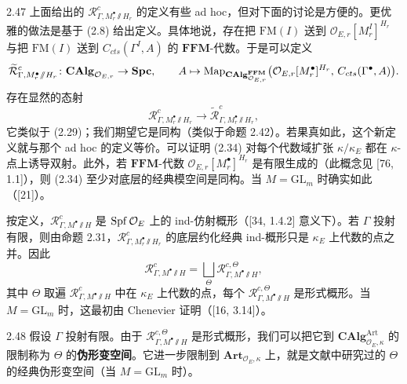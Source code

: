 \begin{rem}{2.47}
上面给出的 $\mathcal R^c_{\Gamma,M^\bullet_r\sslash H_r}$ 的定义有些 ad hoc，但对下面的讨论是方便的。更优雅的做法是基于 (2.8) 给出定义。具体地说，存在把 $\mathrm{FM}(I)$ 送到 $\mathcal O_{E,r}[M^I_r]^{H_r}$ 与把 $\mathrm{FM}(I)$ 送到 $C_{cts}(\Gamma^I, A)$ 的 $\mathbf{FFM}$-代数。于是可以定义
\[
\widetilde{\mathcal R}^{c}_{\Gamma,M^\bullet_r\sslash H_r}\colon \mathbf{CAlg}_{\mathcal O_{E,r}} \to \mathbf{Spc},\qquad
A \mapsto \operatorname{Map}_{\mathbf{CAlg}^{\mathbf{FFM}}_{\mathcal O_{E,r}}}\bigl(\mathcal O_{E,r}[M^\bullet_r]^{H_r},\, C_{cts}(\Gamma^\bullet, A)\bigr).
\]
存在显然的态射
\begin{equation}
\tag{2.34}
\mathcal R^{c}_{\Gamma,M^\bullet_r\sslash H_r} \to \widetilde{\mathcal R}^{c}_{\Gamma,M^\bullet_r\sslash H_r},
\end{equation}
它类似于 (2.29)；我们期望它是同构（类似于命题 2.42）。若果真如此，这个新定义就与那个 ad hoc 的定义等价。可以证明 (2.34) 对每个代数域扩张 $\kappa/\kappa_E$ 都在 $\kappa$-点上诱导双射。此外，若 $\mathbf{FFM}$-代数 $\mathcal O_{E,r}[M^\bullet_r]^{H_r}$ 是有限生成的（此概念见 [76, 1.1]），则 (2.34) 至少对底层的经典模空间是同构。当 $M = \mathrm{GL}_m$ 时确实如此（[21]）。
\label{rem:zhu2-2-47}
\end{rem}

按定义，$\mathcal R^c_{\Gamma,M^\bullet\sslash H}$ 是 $\operatorname{Spf}\mathcal O_E$ 上的 ind-仿射概形（[34, 1.4.2] 意义下）。若 $\Gamma$ 投射有限，则由命题 2.31，$\mathcal R^c_{\Gamma,M^\bullet_r\sslash H_r}$ 的底层约化经典 ind-概形只是 $\kappa_E$ 上代数的点之并。因此
\begin{equation}
\tag{2.35}
\mathcal R^c_{\Gamma,M^\bullet\sslash H} = \bigsqcup_\Theta \mathcal R^{c,\Theta}_{\Gamma,M^\bullet\sslash H},
\end{equation}
其中 $\Theta$ 取遍 $\mathcal R^c_{\Gamma,M^\bullet\sslash H}$ 中在 $\kappa_E$ 上代数的点，每个 $\mathcal R^{c,\Theta}_{\Gamma,M^\bullet\sslash H}$ 是形式概形。当 $M = \mathrm{GL}_m$ 时，这最初由 Chenevier 证明（[16, 3.14]）。

\begin{rem}{2.48}
假设 $\Gamma$ 投射有限。由于 $\mathcal R^{c,\Theta}_{\Gamma,M^\bullet\sslash H}$ 是形式概形，我们可以把它到 $\mathbf{CAlg}^{\mathrm{Art}}_{\mathcal O_E,\kappa}$ 的限制称为 $\Theta$ 的\textbf{伪形变空间}。它进一步限制到 $\mathbf{Art}_{\mathcal O_E,\kappa}$ 上，就是文献中研究过的 $\Theta$ 的经典伪形变空间（当 $M = \mathrm{GL}_m$ 时）。
\label{rem:zhu2-2-48}
\end{rem}

